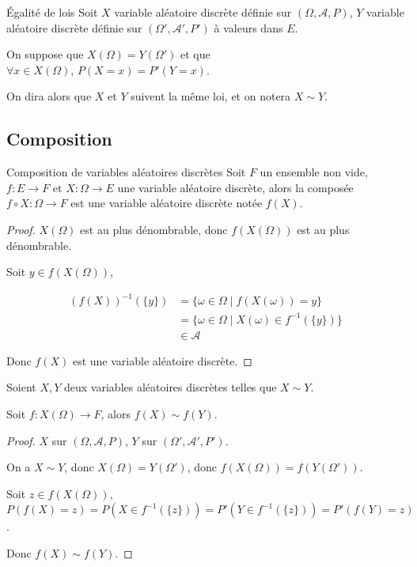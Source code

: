 \begin{definition}{Égalité de lois}{}
    Soit $X$ variable aléatoire discrète définie sur $(\Omega, \mathcal A, P)$, $Y$ variable aléatoire discrète définie 
    sur $(\Omega', \mathcal A', P')$ à valeurs dans $E$.

    On suppose que $X(\Omega) = Y(\Omega')$ et que $\forall x \in X(\Omega), \, P(X = x) = P'(Y = x)$.

    On dira alors que $X$ et $Y$ suivent la même loi, et on notera $X \sim Y$.
\end{definition}

\subsection{Composition}

\begin{theoreme}{Composition de variables aléatoires discrètes}{}
    Soit $F$ un ensemble non vide, $f : E \to F$ et $X : \Omega \to E$ une variable aléatoire discrète, 
    alors la composée $f \circ X : \Omega \to F$ est une variable aléatoire discrète notée $f(X)$.
\end{theoreme}

\begin{proof}
    $X(\Omega)$ est au plus dénombrable, donc $f(X(\Omega))$ est au plus dénombrable.

    Soit $y \in f(X(\Omega))$, 

    \begin{align}
        (f(X))^{-1}(\{y\}) & = \{\omega \in \Omega \mid f(X(\omega)) = y\} \\
        & = \{\omega \in \Omega \mid X(\omega) \in f^{-1}(\{y\})\} \\
        & \in \mathcal A
    \end{align}

    Donc $f(X)$ est une variable aléatoire discrète.
\end{proof}

\begin{theoreme}{}{}
    Soient $X, Y$ deux variables aléatoires discrètes telles que $X \sim Y$. 

    Soit $f : X(\Omega) \to F$, alors $f(X) \sim f(Y)$.
\end{theoreme}

\begin{proof}
    $X$ sur $(\Omega, \mathcal A, P)$, $Y$ sur $(\Omega', \mathcal A', P')$.

    On a $X \sim Y$, donc $X(\Omega) = Y(\Omega')$, donc $f(X(\Omega)) = f(Y(\Omega'))$.

    Soit $z \in f(X(\Omega))$, $P(f(X) = z) = P(X \in f^{-1}(\{z\})) = P'(Y \in f^{-1}(\{z\})) = P'(f(Y) = z)$.

    Donc $f(X) \sim f(Y)$.
\end{proof}

